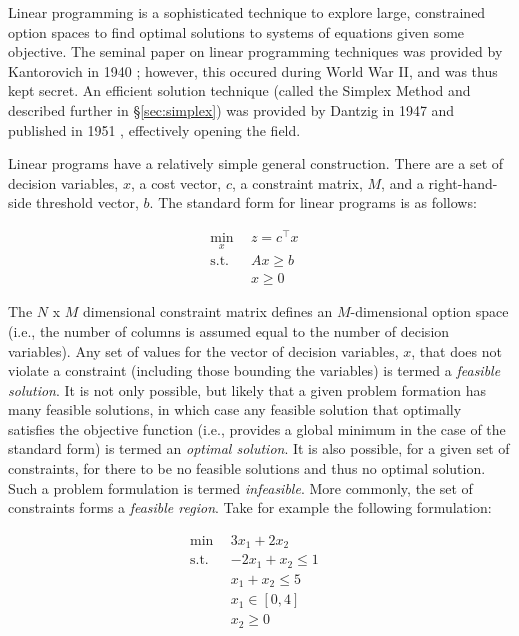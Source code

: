 Linear programming is a sophisticated technique to explore large, constrained
option spaces to find optimal solutions to systems of equations given some
objective. The seminal paper on linear programming techniques was provided by
Kantorovich in 1940 \cite{kantorovich_new_1940}; however, this occured during
World War II, and was thus kept secret. An efficient solution technique (called
the Simplex Method and described further in \S\ref{sec:simplex}) was provided by
Dantzig in 1947 and published in 1951 \cite{dantzig_maximization_1951},
effectively opening the field.

Linear programs have a relatively simple general construction. There are a set of
decision variables, $x$, a cost vector, $c$, a constraint matrix, $M$, and a
right-hand-side threshold vector, $b$. The standard form for linear programs is
as follows:

\begin{subequations}\label{eqs:std-form}
  \begin{align}
    \min_{x} \:\: & 
    z = c^{\top} x
    & \label{eqs:std-form_obj} \\
    \text{s.t.} \:\: &
    A x \geq b 
    & \label{eqs:std-form_sup} \\
    &
    x \geq 0
    &\label{eqs:std-form_x}
  \end{align}
\end{subequations}

The $N$ x $M$ dimensional constraint matrix defines an $M$-dimensional option
space (i.e., the number of columns is assumed equal to the number of decision
variables). Any set of values for the vector of decision variables, $x$, that
does not violate a constraint (including those bounding the variables) is termed
a \textit{feasible solution}. It is not only possible, but likely that a given
problem formation has many feasible solutions, in which case any feasible
solution that optimally satisfies the objective function (i.e., provides a
global minimum in the case of the standard form) is termed an \textit{optimal
solution}. It is also possible, for a given set of constraints, for there to be
no feasible solutions and thus no optimal solution. Such a problem formulation
is termed \textit{infeasible}. More commonly, the set of constraints forms
a \textit{feasible region}. Take for example the following formulation:

\begin{subequations}\label{eqs:feas}
  \begin{align}
    \min \:\: & 
    3 x_1 + 2 x_2
    & \label{eqs:feas_obj} \\
    \text{s.t.} \:\: &
    -2 x_1 + x_2 \leq 1 \\
    &
    x_1 + x_2 \leq 5 
    & \label{eqs:feas_sup} \\
    &
    x_1 \in [0, 4]
    &\label{eqs:feas_x1} \\
    &
    x_2 \geq 0
    &\label{eqs:feas_x2}
  \end{align}
\end{subequations}

